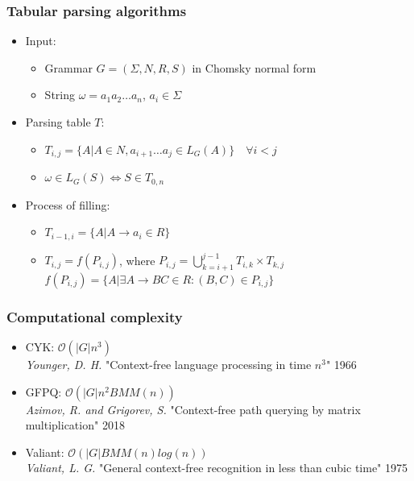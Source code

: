 \documentclass[xcolor=table]{beamer}
\begin{document}
\begin{frame}[fragile] \frametitle{Tabular parsing algorithms}

\begin{itemize}
    \item Input:
    \begin{itemize}
        \item Grammar $G = (\Sigma, N, R, S)$ in Chomsky normal form
        \item String $\omega = a_{1}a_{2} \dots a_{n}$, $a_i \in \Sigma$
    \end{itemize}
    \item Parsing table $T$:
        \begin{itemize}
            \item $T_{i, j} =  \{ A | A \in N, a_{i + 1} \dots a_{j} \in L_{G}(A)\} \quad \forall i < j$
            \item $\omega \in L_{G}(S) \iff S \in T_{0, n}$
        \end{itemize}
    \item Process of filling:
        \begin{itemize}
            \item $T_{i - 1, i} = \{ A | A \rightarrow a_{i} \in R\}$
            \vspace{5}
            \item $T_{i, j} = f(P_{i, j})$, where $P_{i, j} = \bigcup\limits_{k = i + 1}^{j - 1} T_{i,k} \times T_{k, j}$ \\ 
            \hspace{85} $f(P_{i, j}) = \{A | \exists A \rightarrow BC \in R : (B, C) \in P_{i, j}\}$
        \end{itemize}
    
\end{itemize}
\end{frame}



\begin{frame}[fragile] \frametitle{Computational complexity}
    
    \begin{itemize}
        \item CYK: $\mathcal{O}(|G|n^3)$  \\
        \emph{Younger, D. H.} "Context-free language processing in time $n^3$" 1966
        \item GFPQ: $\mathcal{O}(|G|n^2BMM(n))$ \\
        \emph{Azimov, R. and Grigorev, S.}  "Context-free path querying by matrix multiplication" 2018
        \vspace{5}
        \pause
        \item Valiant: $\mathcal{O}(|G|BMM(n)log(n))$ \\
        \emph{Valiant, L. G.} "General context-free recognition in less than cubic time" 1975
    \end{itemize}
    
  
    
\end{frame}
\end{document}
